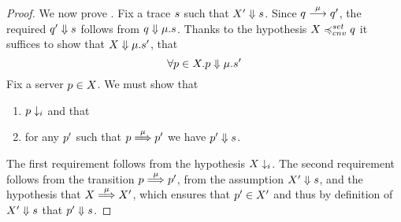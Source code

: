 \begin{proof}
  We now prove .
  Fix a trace $s$ such that $X' \mathrel{\Downarrow} s$.
  Since  $q \mathrel{\overset{\mu}\longrightarrow} q'$, the required  $q' \mathrel{\Downarrow} s$ follows
  from $ q \mathrel{\Downarrow} \mu.s $.
  Thanks to the hypothesis $X \cnvleqset \serverB$ it suffices to show that
  $X \mathrel{\Downarrow} \mu.s'$, \ie that
  $$
  \forall p \in X . p \mathrel{\Downarrow} \mu.s'
  $$
  Fix a server $p \in X$.
  We must show that
  \begin{enumerate}
  \item $p \downarrow_i$ and that
  \item for any $p'$ such that $p \mathrel{\overset{\mu} \Longrightarrow} p'$ we have $p' \mathrel{\Downarrow} s$.
  \end{enumerate}
  The first requirement follows from the hypothesis $X \downarrow_i$.
  The second requirement follows from the transition $p \mathrel{\overset{\mu} \Longrightarrow} p'$,
  from the assumption $X' \mathrel{\Downarrow} s$,
  and the hypothesis that  $X \mathrel{\overset{\mu} \Longrightarrow} X'$, which ensures that
  $p' \in X'$ and thus by definition of $X' \mathrel{\Downarrow} s$ that $p' \mathrel{\Downarrow} s$.
\end{proof}



